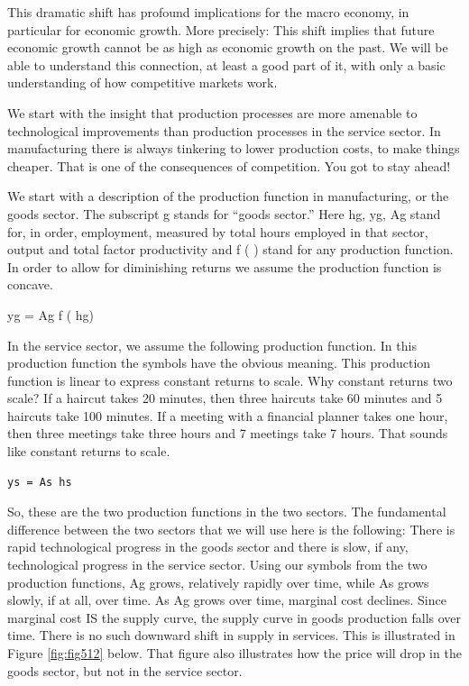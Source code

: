 \documentclass[
]{book}
\begin{document}
This dramatic shift has profound implications for the macro economy, in particular for economic growth. More precisely: This shift implies that future economic growth cannot be as high as economic growth on the past. We will be able to understand this connection, at least a good part of it, with only a basic understanding of how competitive markets work.

We start with the insight that production processes are more amenable to technological improvements than production processes in the service sector. In manufacturing there is always tinkering to lower production costs, to make things cheaper. That is one of the consequences of competition. You got to stay ahead!

We start with a description of the production function in manufacturing, or the goods sector. The subscript g stands for ``goods sector.'' Here hg, yg, Ag stand for, in order, employment, measured by total hours employed in that sector, output and total factor productivity and f ( ) stand for any production function. In order to allow for diminishing returns we assume the production function is concave.

yg = Ag f ( hg)

In the service sector, we assume the following production function. In this production function the symbols have the obvious meaning. This production function is linear to express constant returns to scale. Why constant returns two scale? If a haircut takes 20 minutes, then three haircuts take 60 minutes and 5 haircuts take 100 minutes. If a meeting with a financial planner takes one hour, then three meetings take three hours and 7 meetings take 7 hours. That sounds like constant returns to scale.

\begin{verbatim}
ys = As hs  
\end{verbatim}

So, these are the two production functions in the two sectors. The fundamental difference between the two sectors that we will use here is the following:
There is rapid technological progress in the goods sector and there is slow, if any, technological progress in the service sector. Using our symbols from the two production functions, Ag grows, relatively rapidly over time, while As grows slowly, if at all, over time. As Ag grows over time, marginal cost declines. Since marginal cost IS the supply curve, the supply curve in goods production falls over time. There is no such downward shift in supply in services. This is illustrated in Figure \ref{fig:fig512} below. That figure also illustrates how the price will drop in the goods sector, but not in the service sector.
\end{document}
